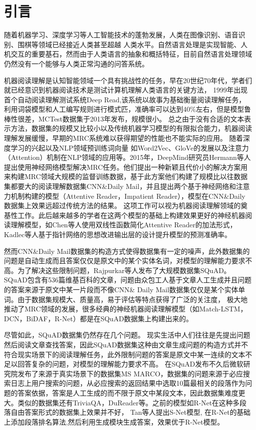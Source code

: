 \section{引言}

随着机器学习、深度学习等人工智能技术的蓬勃发展，人类在图像识别、语音识别、围棋等领域已经接近人类甚至超越
人类水平。自然语言处理是实现智能、人机交互的重要基石，然而由于人类语言的抽象和概括特征，目前自然语言处理领域仍然没有一个能够与人类正常沟通的问答系统。


机器阅读理解是认知智能领域一个具有挑战性的任务，早在20世纪70年代，学者们就已经意识到机器阅读技术是测试计算机理解人类语言的关键方法，
1999年出现首个自动阅读理解测试系统Deep Read,该系统以故事为基础衡量阅读理解任务，利用词袋模型和人工编写规则进行模式匹，准确率可以达到40\%左右，但是模型鲁棒性很差，MCTest数据集于2013年发布，规模很小。
总之由于没有合适的文本表示方法，数据集的规模又比较小以及传统机器学习模型的有限拟合能力，机器阅读理解发展缓慢，早期的MRC系统难以获得期望的性能也不能实际的应用。
随着深度学习的兴起以及NLP领域预训练词向量
如Word2Vec、GloVe的发展以及注意力（Attention）机制在NLP领域的应用等。2015年，DeepMind研究员Hermann等人提出使用神经网络模型解决MRC任务。他们提出一种新颖且代价小的解决方案用来构建MRC领域大规模的监督训练数据，基于此方案他们构建了规模比以往数据集都要大的阅读理解数据集CNN\&Daily Mail，并且提出两个基于神经网络和注意力机制构建的模型（Attentive Reader，Impatient Reader），模型在CNN\&Daily数据集上效果远超过传统方法的结果。
这项工作可以视为机器阅读理解领域的奠基性工作。此后越来越多的学者在这两个模型的基础上构建效果更好的神经机器阅读理解模型，如Chen等人使用双线性函数简化Attentive Reader的加法形式，Kadlec等人基于指针网络\cite{Ptr}的思想改进输出层的设计提升模型的预测准确率。

然而CNN\&Daily Mail数据集的构造方式使得数据集有一定的噪声，此外数据集的问题是自动生成而且答案仅仅是原文中的某个实体名词，对模型的理解能力要求不高。为了解决这些限制问题，Rajpurkar等人\cite{SQuAD1}发布了大规模数据集SQuAD。SQuAD包含有536篇维基百科的文章，问题由众包工人基于文章人工生成并且问题的答案来源于原文中某一片段而不像CNN\& Daily Mail数据集仅仅是某个实体单词。由于数据集规模大、质量高，易于评估等特点获得了广泛的关注度，
极大地推动了MRC领域的发展，很多经典的神经机器阅读理解模型（如Match-LSTM，DCN，BiDAF，R-Net）都是在SQuAD数据集上构建出来的。


尽管如此，SQuAD数据集仍然存在几个问题。
现实生活中人们往往是先提出问题然后阅读文章查找答案，因此SQuAD数据集这种由文章生成问题的构造方式并不符合现实场景下的阅读理解任务，此外限制问题的答案是原文中某一连续的文本不足以回答复杂的问题，对模型的理解能力要求不高。
在SQuAD发布不久后微软研究院发布了来源于真实场景下的数据集MS MARCO，数据集的问题来源于必应搜索日志上用户搜索的问题，从必应搜索的返回结果中选取10篇最相关的段落作为问题的答案依据，答案是人工生成的而不限于原文中某段文本，因此数据集难度更大。类似的数据集还有TriviaQA，DuReader等。之前的模型如R-Net在这种多段落自由答案形式的数据集上效果并不好，
Tan等人提出S-Net模型,
在R-Net的基础上添加段落排名算法,然后利用生成模块生成答案，效果优于R-Net模型。

